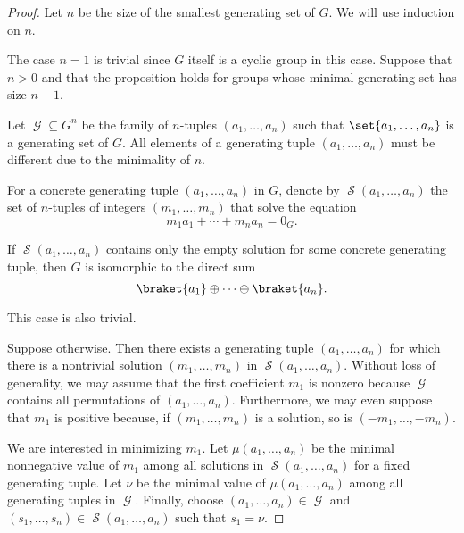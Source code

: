 \begin{proof}
  Let \( n \) be the size of the smallest generating set of \( G \). We will use induction on \( n \).

  The case \( n = 1 \) is trivial since \( G \) itself is a cyclic group in this case. Suppose that \( n > 0 \) and that the proposition holds for groups whose minimal generating set has size \( n - 1 \).

  Let \( \mscrG \subseteq G^n \) be the family of \( n \)-tuples \( (a_1, \ldots, a_n) \) such that \( \set{ a_1, \ldots, a_n } \) is a generating set of \( G \). All elements of a generating tuple \( (a_1, \ldots, a_n) \) must be different due to the minimality of \( n \).

  For a concrete generating tuple \( (a_1, \ldots, a_n) \) in \( G \), denote by \( \mscrS(a_1, \ldots, a_n) \) the set of \( n \)-tuples of integers \( (m_1, \ldots, m_n) \) that solve the equation
  \begin{equation}\label{eq:thm:fundamental_theorem_of_finitely_generated_abelian_groups/proof/equation_general}
    m_1 a_1 + \cdots + m_n a_n = 0_G.
  \end{equation}

  If \( \mscrS(a_1, \ldots, a_n) \) contains only the empty solution for some concrete generating tuple, then \( G \) is isomorphic to the direct sum
  \begin{equation*}
    \braket{ a_1 } \oplus \cdots \oplus \braket{ a_n }.
  \end{equation*}

  This case is also trivial.

  Suppose otherwise. Then there exists a generating tuple \( (a_1, \ldots, a_n) \) for which there is a nontrivial solution \( (m_1, \ldots, m_n) \) in \( \mscrS(a_1, \ldots, a_n) \). Without loss of generality, we may assume that the first coefficient \( m_1 \) is nonzero because \( \mscrG \) contains all permutations of \( (a_1, \ldots, a_n) \). Furthermore, we may even suppose that \( m_1 \) is positive because, if \( (m_1, \ldots, m_n) \) is a solution, so is \( (-m_1, \ldots, -m_n) \).

  We are interested in minimizing \( m_1 \). Let \( \mu(a_1, \ldots, a_n) \) be the minimal nonnegative value of \( m_1 \) among all solutions in \( \mscrS(a_1, \ldots, a_n) \) for a fixed generating tuple. Let \( \nu \) be the minimal  value of \( \mu(a_1, \ldots, a_n) \) among all generating tuples in \( \mscrG \). Finally, choose \( (a_1, \ldots, a_n) \in \mscrG \) and \( (s_1, \ldots, s_n) \in \mscrS(a_1, \ldots, a_n) \) such that \( s_1 = \nu \).


\end{proof}
